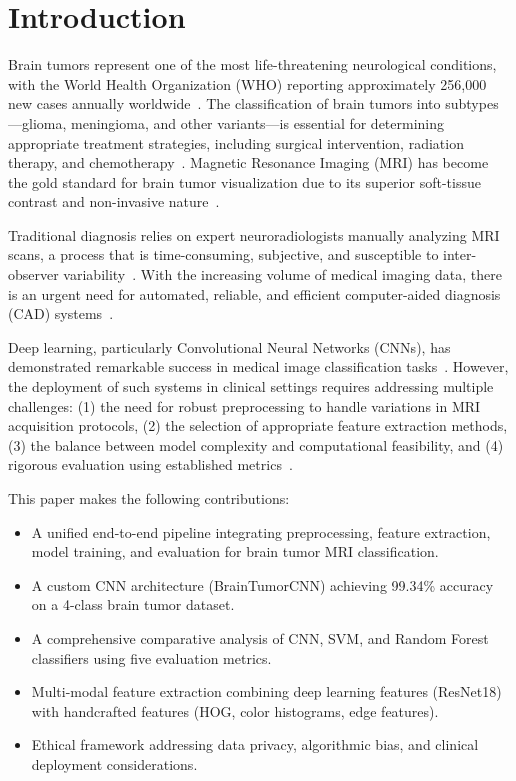 \documentclass[conference]{IEEEtran}
\begin{document}
\section{Introduction}
\label{sec:introduction}

Brain tumors represent one of the most life-threatening neurological conditions, with the World Health Organization (WHO) reporting approximately 256,000 new cases annually worldwide~\cite{who2023}. The classification of brain tumors into subtypes---glioma, meningioma, and other variants---is essential for determining appropriate treatment strategies, including surgical intervention, radiation therapy, and chemotherapy~\cite{lcdc2017}. Magnetic Resonance Imaging (MRI) has become the gold standard for brain tumor visualization due to its superior soft-tissue contrast and non-invasive nature~\cite{mri2019}.

Traditional diagnosis relies on expert neuroradiologists manually analyzing MRI scans, a process that is time-consuming, subjective, and susceptible to inter-observer variability~\cite{traditional2020}. With the increasing volume of medical imaging data, there is an urgent need for automated, reliable, and efficient computer-aided diagnosis (CAD) systems~\cite{cad2021}.

Deep learning, particularly Convolutional Neural Networks (CNNs), has demonstrated remarkable success in medical image classification tasks~\cite{deepmed2020}. However, the deployment of such systems in clinical settings requires addressing multiple challenges: (1) the need for robust preprocessing to handle variations in MRI acquisition protocols, (2) the selection of appropriate feature extraction methods, (3) the balance between model complexity and computational feasibility, and (4) rigorous evaluation using established metrics~\cite{challenges2022}.

This paper makes the following contributions:
\begin{itemize}
    \item A unified end-to-end pipeline integrating preprocessing, feature extraction, model training, and evaluation for brain tumor MRI classification.
    \item A custom CNN architecture (BrainTumorCNN) achieving 99.34\% accuracy on a 4-class brain tumor dataset.
    \item A comprehensive comparative analysis of CNN, SVM, and Random Forest classifiers using five evaluation metrics.
    \item Multi-modal feature extraction combining deep learning features (ResNet18) with handcrafted features (HOG, color histograms, edge features).
    \item Ethical framework addressing data privacy, algorithmic bias, and clinical deployment considerations.
\end{itemize}
\end{document}
